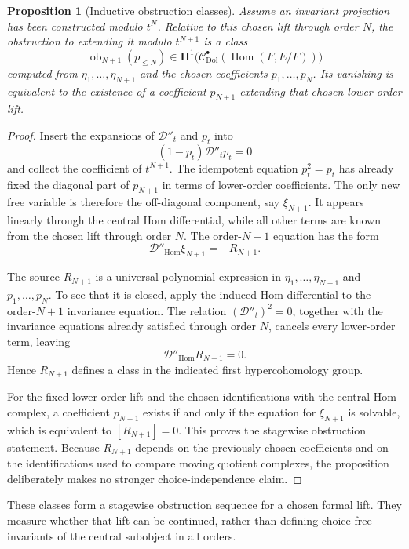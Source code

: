 \documentclass[11pt,reqno]{amsart}
\newtheorem{proposition}[theorem]{Proposition}
\theoremstyle{definition}
\theoremstyle{remark}
\newcommand{\cC}{\mathcal C}
\newcommand{\cD}{\mathcal D}
\newcommand{\Hom}{\operatorname{Hom}}
\newcommand{\Dol}{\mathrm{Dol}}
\begin{document}
\begin{proposition}[Inductive obstruction classes]\label{prop:higher-obstructions}
Assume an invariant projection has been constructed modulo $t^N$.  Relative to this chosen lift through order $N$, the obstruction to extending it modulo $t^{N+1}$ is a class
\begin{equation}\label{eq:obN}
  \operatorname{ob}_{N+1}(p_{\le N})
  \in
  \mathbf H^1\bigl(\cC^\bullet_{\Dol}(\Hom(F,E/F))\bigr)
\end{equation}
computed from $\eta_1,\dots,\eta_{N+1}$ and the chosen coefficients $p_1,\dots,p_N$.  Its vanishing is equivalent to the existence of a coefficient $p_{N+1}$ extending that chosen lower-order lift.
\end{proposition}

\begin{proof}
Insert the expansions of $\cD''_t$ and $p_t$ into
\[
  (1-p_t)\cD''_tp_t=0
\]
and collect the coefficient of $t^{N+1}$.  The idempotent equation $p_t^2=p_t$ has already fixed the diagonal part of $p_{N+1}$ in terms of lower-order coefficients.  The only new free variable is therefore the off-diagonal component, say $\xi_{N+1}$.  It appears linearly through the central Hom differential, while all other terms are known from the chosen lift through order $N$.  The order-$N+1$ equation has the form
\[
  \cD''_{\Hom}\xi_{N+1}=-R_{N+1}.
\]

The source $R_{N+1}$ is a universal polynomial expression in $\eta_1,\ldots,\eta_{N+1}$ and $p_1,\ldots,p_N$.  To see that it is closed, apply the induced Hom differential to the order-$N+1$ invariance equation.  The relation $(\cD''_t)^2=0$, together with the invariance equations already satisfied through order $N$, cancels every lower-order term, leaving
\[
  \cD''_{\Hom}R_{N+1}=0.
\]
Hence $R_{N+1}$ defines a class in the indicated first hypercohomology group.

For the fixed lower-order lift and the chosen identifications with the central Hom complex, a coefficient $p_{N+1}$ exists if and only if the equation for $\xi_{N+1}$ is solvable, which is equivalent to $[R_{N+1}]=0$.  This proves the stagewise obstruction statement.  Because $R_{N+1}$ depends on the previously chosen coefficients and on the identifications used to compare moving quotient complexes, the proposition deliberately makes no stronger choice-independence claim.
\end{proof}

These classes form a stagewise obstruction sequence for a chosen formal lift.  They measure whether that lift can be continued, rather than defining choice-free invariants of the central subobject in all orders.
\end{document}
